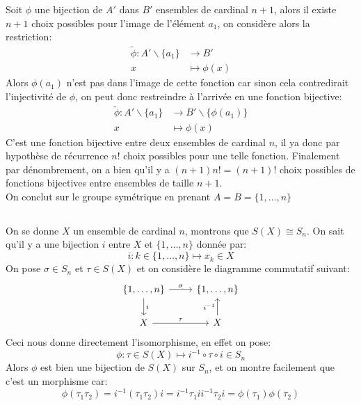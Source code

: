 \documentclass{report}
\begin{document}
         Soit $\phi$ une bijection de $A'$ dans $B'$ ensembles de cardinal \(n+1\), alors il existe $n + 1$ choix possibles pour l'image de l'élément $a_1$, on considère alors la restriction:
         \[
            \begin{aligned}
               \widetilde{\phi}: A' \backslash \{a_1\} &\longrightarrow B'\\
               x &\longmapsto \phi(x) 
            \end{aligned}
         \]
         Alors $\phi(a_1)$ n'est pas dans l'image de cette fonction car sinon cela contredirait l'injectivité de $\phi$, on peut donc restreindre à l'arrivée en une fonction bijective:
         \[
            \begin{aligned}
               \widetilde{\phi}: A' \backslash \{a_1\} &\longrightarrow B'\backslash \{\phi(a_1)\}\\
               x &\longmapsto \phi(x) 
            \end{aligned}
         \]
         C'est une fonction bijective entre deux ensembles de cardinal $n$, il ya donc par hypothèse de récurrence $n!$ choix possibles pour une telle fonction. Finalement par dénombrement, on a bien qu'il y a $(n +1)n! = (n+1)!$ choix possibles de fonctions bijectives entre ensembles de taille $n+1$.\\
      
         On conclut sur le groupe symétrique en prenant $A = B = \{1, \ldots, n\}$
      \subsection*{}
         On se donne $X$ un ensemble de cardinal $n$, montrons que $S(X) \cong S_n$.
         On sait qu'il y a une bijection $i$ entre $X$ et $\{1, \ldots, n\}$ donnée par:
         $$
            i : k \in \{1, \ldots, n\} \mapsto x_k \in X
         $$
         On pose $\sigma \in S_n$ et $\tau \in S(X)$ et on considère le diagramme commutatif suivant:
         $$
            \begin{tikzcd}
               \{1, \ldots, n\} \arrow[r, "\sigma"] \arrow[d, "i"]
               & \{1, \ldots, n\}\\
               X \arrow[r, "\tau"]
               & X \arrow[u, "i^{-1}"]
            \end{tikzcd}
         $$
         Ceci nous donne directement l'isomorphisme, en effet on pose:
         $$
            \phi : \tau \in S(X) \mapsto i^{-1} \circ \tau \circ i \in S_n
         $$
         Alors $\phi$ est bien une bijection de $S(X)$ sur $S_n$, et on montre facilement que c'est un morphisme car:
         $$
            \phi(\tau_1\tau_2) = i^{-1}(\tau_1\tau_2)i = i^{-1}\tau_1 ii^{-1}\tau_2i = \phi(\tau_1)\phi(\tau_2)
         $$
         \pagebreak 
\end{document}
